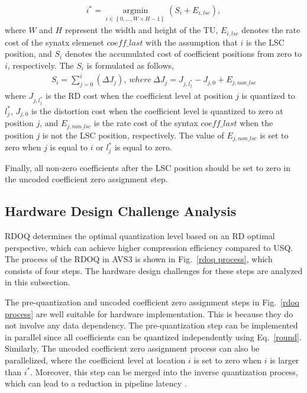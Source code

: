 \documentclass[lettersize,journal]{IEEEtran}
\begin{document}
\begin{equation}
	\begin{aligned}
		\label{i_optimal}
		i_{}^{*} =\mathop{\arg\min}\limits_{i \in \left \{ 0,...,W\times H-1\right \} } \left ( S_{i} + E_{i,lsc}   \right ),
	\end{aligned}
\end{equation}
where $W$ and $H$ represent the width and height of the TU, $E_{i,lsc}$ denotes the rate cost of the synatx elemenet $coeff\_last$ with the assumption that $i$ is the LSC position, and $S_{i}$ denotes the accumulated cost of coefficient positions from zero to $i$, respectively. The $S_{i}$ is formulated as follows, 
\begin{equation}
	\begin{aligned}
		\label{A_i,last}
S_{i} = \sum_{j=0}^{i}\left ( \Delta J_{j} \right), \ where \   \Delta J_{j} = J_{j,l_{j}^{*}} - J_{j,0} + E_{j,non\_lsc}
	\end{aligned}
\end{equation}
where $J_{j,l_{j}^{*}}$ is the RD cost when the coefficient level at position $j$ is quantized to $l_{j}^{*}$, $J_{j,0}$ is the distortion cost when the coefficient level is quantized to zero at position $j$, and $E_{j,non\_lsc}$ is the rate cost of the syntax $coeff\_last$ when the position $j$ is not the LSC position, respectively. The value of $E_{j,non\_lsc}$ is set to zero when $j$ is equal to $i$ or $l_{j}^{*}$ is equal to zero. 

Finally, all non-zero coefficients after the LSC position should be set to zero in the uncoded coefficient zero assignment step. 

\subsection{Hardware Design Challenge Analysis}
\label{subsec:B}
RDOQ determines the optimal quantization level based on an RD optimal perspective, which can achieve higher compression efficiency compared to USQ. The process of the RDOQ in AVS3 is shown in Fig.~\ref{rdoq process}, which consists of four steps. The hardware design challenges for these steps are analyzed in this subsection. 

The pre-quantization and uncoded coefficient zero assignment steps in Fig.~\ref{rdoq process} are well suitable for hardware implementation. This is because they do not involve any data dependency. The pre-quantization step can be implemented in parallel since all coefficients can be quantized independently using Eq.~\eqref{round}. Similarly, The uncoded coefficient zero assignment process can also be parallelized, where the coefficient level at location $i$ is set to zero when $i$ is larger than $i_{}^{*}$. Moreover, this step can be merged into the inverse quantization process, which can lead to a reduction in pipeline latency \cite{braatz2018high}. 
\end{document}
